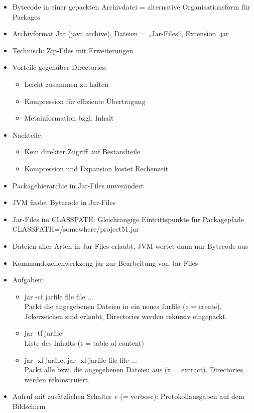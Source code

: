 \begin{itemize}
\item Bytecode in einer gepackten Archivdatei = alternative Organisationsform für Packages
\item Archivformat Jar (java archive), Dateien = „Jar-Files“, Extension .jar
\item Technisch: Zip-Files mit Erweiterungen
\item Vorteile gegenüber Directories:
	\begin{itemize}
	\item Leicht zusammen zu halten
	\item Kompression für effiziente Übertragung
	\item Metainformation bzgl. Inhalt
	\end{itemize}
\item Nachteile:
	\begin{itemize}
	\item Kein direkter Zugriff auf Bestandteile
	\item Kompression und Expansion kostet Rechenzeit
	\end{itemize}
\item Packagehierarchie in Jar-Files unverändert
\item JVM findet Bytecode in Jar-Files
\item Jar-Files im CLASSPATH: Gleichrangige Eintrittspunkte für Packagepfade\\
 CLASSPATH=/somewhere/project51.jar
\item Dateien aller Arten in Jar-Files erlaubt, JVM wertet dann nur Bytecode aus
\item Kommandozeilenwerkzeug jar zur Bearbeitung von Jar-Files
\item Aufgaben:
	\begin{itemize}
	\item  jar -cf jarfile file file ...\\
	Packt die angegebenen Dateien in ein neues Jarfile (c = create).\\
	Jokerzeichen sind erlaubt, Directories werden rekursiv eingepackt.
	\item  jar -tf jarfile\\
	Liste des Inhalts (t = table of content)
	\item  jar -xf jarfile, jar -xf jarfile file file ...\\
	Packt alle bzw. die angegebenen Dateien aus (x = extract). Directories werden rekonstruiert.
	\end{itemize}
\item Aufruf mit zusätzlichen Schalter v (= verbose): Protokollausgaben auf dem Bildschirm

\end{itemize}

